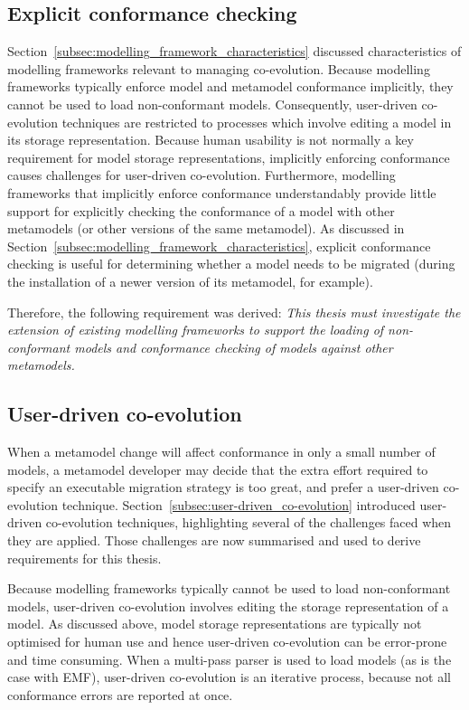 \subsection{Explicit conformance checking}
Section~\ref{subsec:modelling_framework_characteristics} discussed characteristics of modelling frameworks relevant to managing co-evolution. Because modelling frameworks typically enforce model and metamodel conformance implicitly, they cannot be used to load non-conformant models. Consequently, user-driven co-evolution techniques are restricted to processes which involve editing a model in its storage representation. Because human usability is not normally a key requirement for model storage representations, implicitly enforcing conformance causes challenges for user-driven co-evolution. Furthermore, modelling frameworks that implicitly enforce conformance understandably provide little support for explicitly checking the conformance of a model with other metamodels (or other versions of the same metamodel). As discussed in Section~\ref{subsec:modelling_framework_characteristics}, explicit conformance checking is useful for determining whether a model needs to be migrated (during the installation of a newer version of its metamodel, for example).

Therefore, the following requirement was derived: \emph{This thesis must investigate the extension of existing modelling frameworks to support the loading of non-conformant models and conformance checking of models against other metamodels.}




\subsection{User-driven co-evolution}
When a metamodel change will affect conformance in only a small number of models, a metamodel developer may decide that the extra effort required to specify an executable migration strategy is too great, and prefer a user-driven co-evolution technique. Section~\ref{subsec:user-driven_co-evolution} introduced user-driven co-evolution techniques, highlighting several of the challenges faced when they are applied. Those challenges are now summarised and used to derive requirements for this thesis.

Because modelling frameworks typically cannot be used to load non-conformant models, user-driven co-evolution involves editing the storage representation of a model. As discussed above, model storage representations are typically not optimised for human use and hence user-driven co-evolution can be error-prone and time consuming. When a multi-pass parser is used to load models (as is the case with EMF), user-driven co-evolution is an iterative process, because not all conformance errors are reported at once.

